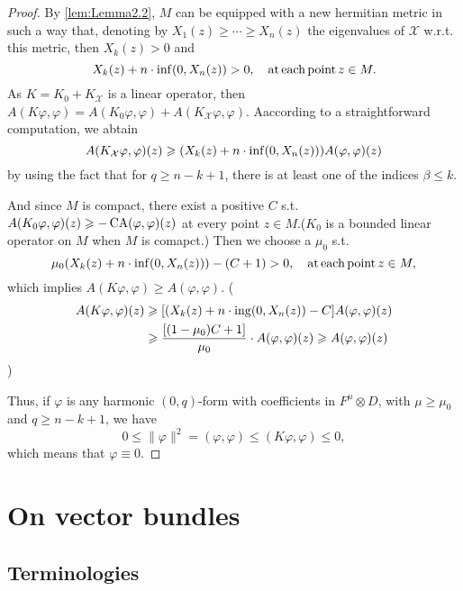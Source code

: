 \documentclass[lang=en,12pt]{beautybook}
\begin{document}
\begin{proof}
  By \autoref{lem:Lemma2.2}, $M$ can be equipped with a new hermitian metric
  in such a way that, denoting by $X_1 (z) \geqslant \cdots \geqslant X_n (z)$
  the eigenvalues of $\mathcal{X}$ w.r.t. this metric, then $X_k (z) > 0$ and
  \[ X_k (z) + n \cdot \inf (0, X_n (z)) > 0, \quad \operatorname{at} \operatorname{each}
     \operatorname{point} z \in M. \]
  As $K = K_0 + K_{\mathcal{X}}$ is a linear operator, then $A (K \varphi,
  \varphi) = A (K_0 \varphi, \varphi) + A (K_{\mathcal{X}} \varphi, \varphi)$.
  Aaccording to a straightforward computation, we abtain
  \[ A (K_{\mathcal{X}} \varphi, \varphi) (z) \geqslant (X_k (z) + n \cdot
     \operatorname{inf} (0, X_n (z))) A (\varphi, \varphi) (z) \]
  by using the fact that for $q \geqslant n - k + 1$, there is at least one
  of the indices $\beta \leqslant k$.
  
  And since $M$ is compact, there exist a positive $C$ s.t. $A (K_0 \varphi,
  \varphi) (z) \geqslant - \operatorname{CA} (\varphi, \varphi) (z)$ at every point $z
  \in M$.($K_0$ is a bounded linear operator on $M$ when $M$ is comapct.) Then
  we choose a $\mu_0$ s.t.
  \[ \mu_0 (X_k (z) + n \cdot \inf (0, X_n (z))) - (C + 1) > 0, \quad
     \operatorname{at} \operatorname{each} \operatorname{point} z \in M, \]
  which implies $A (K \varphi, \varphi) \geqslant A (\varphi, \varphi)$. (
    \begin{align*}
      A (K \varphi, \varphi) (z) &\geqslant [ (X_k (z) + n \cdot
     \operatorname{ing} (0, X_n (z)) - C] A (\varphi, \varphi) (z) \\
     &\geqslant \frac{[(1
     - \mu_0) C + 1]}{\mu_0} \cdot A (\varphi, \varphi) (z) \geqslant A
     (\varphi, \varphi) (z)
    \end{align*}
  )
  
  Thus, if $\varphi$ is any harmonic $(0, q)$-form with coefficients in
  $F^{\mu} \otimes D$, with $\mu \geqslant \mu_0$ and $q \geqslant n - k + 1$,
  we have
  \[ 0 \leqslant \| \varphi \|^2 = (\varphi, \varphi) \leqslant (K \varphi,
     \varphi) \leqslant 0, \]
  which means that $\varphi \equiv 0$.
\end{proof}

\section{On vector bundles}

\subsection{Terminologies}
\end{document}
